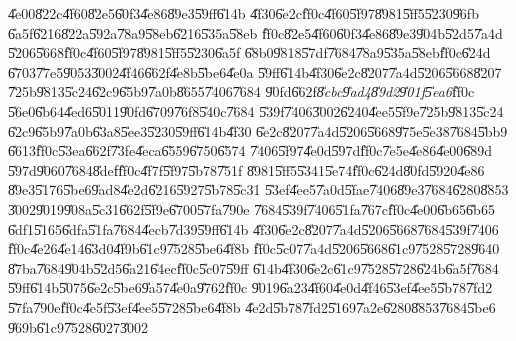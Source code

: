 \documentclass[12pt,a4paper]{article}
\begin{document}
\U{4e00}\U{822c}\U{4f60}\U{82e5}\U{60f3}\U{4e86}\U{89e3}\U{59ff}\U{614b}%
\U{4f30}\U{6e2c}\U{ff0c}\U{4f60}\U{5f97}\U{8981}\U{5ff5}\U{5230}\U{96fb}%
\U{6a5f}\U{6216}\U{822a}\U{592a}\U{78a9}\U{58eb}\U{6216}\U{535a}\U{58eb}%
\U{ff0c}\U{82e5}\U{4f60}\U{60f3}\U{4e86}\U{89e3}\U{904b}\U{52d5}\U{7a4d}%
\U{5206}\U{5668}\U{ff0c}\U{4f60}\U{5f97}\U{8981}\U{5ff5}\U{5230}\U{6a5f}%
\U{68b0}\U{9818}\U{57df}\U{7684}\U{78a9}\U{535a}\U{58eb}\U{ff0c}\U{624d}%
\U{6703}\U{77e5}\U{9053}\U{3002}\U{4f46}\U{662f}\U{4e8b}\U{5be6}\U{4e0a}%
\U{59ff}\U{614b}\U{4f30}\U{6e2c}\U{8207}\U{7a4d}\U{5206}\U{5668}\U{8207}%
\U{725b}\U{9813}\U{5c24}\U{62c9}\U{65b9}\U{7a0b}\U{8655}\U{7406}\U{7684}%
\U{90fd}\U{662f}\emph{\U{8cbc}\U{9ad4}\U{89d2}\U{901f}\U{5ea6}}\U{ff0c}%
\U{56e0}\U{6b64}\U{4ed6}\U{5011}\U{90fd}\U{6709}\U{76f8}\U{540c}\U{7684}%
\U{539f}\U{7406}\U{3002}\U{6240}\U{4ee5}\U{5f9e}\U{725b}\U{9813}\U{5c24}%
\U{62c9}\U{65b9}\U{7a0b}\U{63a8}\U{5ee3}\U{5230}\U{59ff}\U{614b}\U{4f30}%
\U{6e2c}\U{8207}\U{7a4d}\U{5206}\U{5668}\U{975e}\U{5e38}\U{7684}\U{5bb9}%
\U{6613}\U{ff0c}\U{53ea}\U{662f}\U{73fe}\U{4eca}\U{6559}\U{6750}\U{6574}%
\U{7406}\U{5f97}\U{4e0d}\U{597d}\U{ff0c}\U{7e5e}\U{4e86}\U{4e00}\U{689d}%
\U{597d}\U{9060}\U{7684}\U{8def}\U{ff0c}\U{4f7f}\U{5f97}\U{5b78}\U{751f}%
\U{8981}\U{5ff5}\U{5341}\U{5e74}\U{ff0c}\U{624d}\U{80fd}\U{5920}\U{4e86}%
\U{89e3}\U{5176}\U{5be6}\U{9ad8}\U{4e2d}\U{6216}\U{5927}\U{5b78}\U{5c31}%
\U{53ef}\U{4ee5}\U{7a0d}\U{5fae}\U{7406}\U{89e3}\U{7684}\U{6280}\U{8853}%
\U{3002}\U{9019}\U{908a}\U{5c31}\U{662f}\U{5f9e}\U{6700}\U{57fa}\U{790e}%
\U{7684}\U{539f}\U{7406}\U{51fa}\U{767c}\U{ff0c}\U{4e00}\U{6b65}\U{6b65}%
\U{6df1}\U{5165}\U{6dfa}\U{51fa}\U{7684}\U{4ecb}\U{7d39}\U{59ff}\U{614b}%
\U{4f30}\U{6e2c}\U{8207}\U{7a4d}\U{5206}\U{5668}\U{7684}\U{539f}\U{7406}%
\U{ff0c}\U{4e26}\U{4e14}\U{63d0}\U{4f9b}\U{61c9}\U{7528}\U{5be6}\U{4f8b}%
\U{ff0c}\U{5c07}\U{7a4d}\U{5206}\U{5668}\U{61c9}\U{7528}\U{5728}\U{9640}%
\U{87ba}\U{7684}\U{904b}\U{52d5}\U{6a21}\U{64ec}\U{ff0c}\U{5c07}\U{59ff}%
\U{614b}\U{4f30}\U{6e2c}\U{61c9}\U{7528}\U{5728}\U{624b}\U{6a5f}\U{7684}%
\U{59ff}\U{614b}\U{5075}\U{6e2c}\U{5be6}\U{9a57}\U{4e0a}\U{9762}\U{ff0c}%
\U{9019}\U{6a23}\U{4f60}\U{4e0d}\U{4f46}\U{53ef}\U{4ee5}\U{5b78}\U{7fd2}%
\U{57fa}\U{790e}\U{ff0c}\U{4e5f}\U{53ef}\U{4ee5}\U{5728}\U{5be6}\U{4f8b}%
\U{4e2d}\U{5b78}\U{7fd2}\U{5169}\U{7a2e}\U{6280}\U{8853}\U{7684}\U{5be6}%
\U{969b}\U{61c9}\U{7528}\U{6027}\U{3002}

\bigskip
\end{document}
